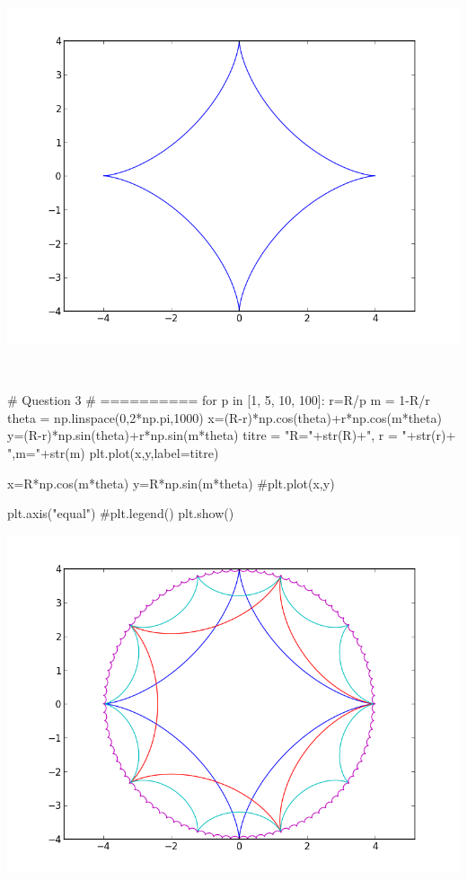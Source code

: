 \documentclass[10pt,fleqn]{article} %
\begin{document}
\begin{multicols}{2}
\begin{center}
\includegraphics[width=.9\linewidth]{images/exo_18_1}
\end{center}

\begin{corrige}
$\quad$
\begin{python}
# Question 3
# ==========
for p in [1, 5, 10, 100]:
    r=R/p
    m = 1-R/r
    theta = np.linspace(0,2*np.pi,1000)
    x=(R-r)*np.cos(theta)+r*np.cos(m*theta)
    y=(R-r)*np.sin(theta)+r*np.sin(m*theta)
    titre = "R="+str(R)+", r = "+str(r)+ ",m="+str(m)
    plt.plot(x,y,label=titre)

x=R*np.cos(m*theta)
y=R*np.sin(m*theta)
#plt.plot(x,y)

plt.axis("equal")
#plt.legend()
plt.show()
\end{python}
\end{corrige}

\begin{center}
\includegraphics[width=.9\linewidth]{images/exo_18_2}
\end{center}




\end{multicols}
\end{document}
